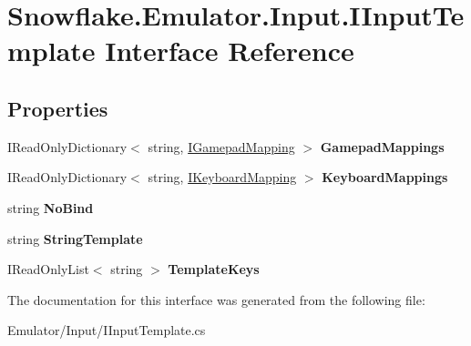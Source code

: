 \hypertarget{interface_snowflake_1_1_emulator_1_1_input_1_1_i_input_template}{}\section{Snowflake.\+Emulator.\+Input.\+I\+Input\+Template Interface Reference}
\label{interface_snowflake_1_1_emulator_1_1_input_1_1_i_input_template}
\subsection*{Properties}
\begin{DoxyCompactItemize}
\item 
\hypertarget{interface_snowflake_1_1_emulator_1_1_input_1_1_i_input_template_ab8e0a7d250f6734b895cc62ef7bbe710}{}I\+Read\+Only\+Dictionary$<$ string, \hyperlink{interface_snowflake_1_1_emulator_1_1_input_1_1_i_gamepad_mapping}{I\+Gamepad\+Mapping} $>$ {\bfseries Gamepad\+Mappings}\label{interface_snowflake_1_1_emulator_1_1_input_1_1_i_input_template_ab8e0a7d250f6734b895cc62ef7bbe710}

\item 
\hypertarget{interface_snowflake_1_1_emulator_1_1_input_1_1_i_input_template_a3e609bf0f4f4515ee91ea05f860f0211}{}I\+Read\+Only\+Dictionary$<$ string, \hyperlink{interface_snowflake_1_1_emulator_1_1_input_1_1_i_keyboard_mapping}{I\+Keyboard\+Mapping} $>$ {\bfseries Keyboard\+Mappings}\label{interface_snowflake_1_1_emulator_1_1_input_1_1_i_input_template_a3e609bf0f4f4515ee91ea05f860f0211}

\item 
\hypertarget{interface_snowflake_1_1_emulator_1_1_input_1_1_i_input_template_a7495a77567b2cc97ecf959ed0f9dc4de}{}string {\bfseries No\+Bind}\label{interface_snowflake_1_1_emulator_1_1_input_1_1_i_input_template_a7495a77567b2cc97ecf959ed0f9dc4de}

\item 
\hypertarget{interface_snowflake_1_1_emulator_1_1_input_1_1_i_input_template_a4771fa7fbc3f801990cf90a03185e010}{}string {\bfseries String\+Template}\label{interface_snowflake_1_1_emulator_1_1_input_1_1_i_input_template_a4771fa7fbc3f801990cf90a03185e010}

\item 
\hypertarget{interface_snowflake_1_1_emulator_1_1_input_1_1_i_input_template_ae96998d9a6dc349e5e12f99d455465d4}{}I\+Read\+Only\+List$<$ string $>$ {\bfseries Template\+Keys}\label{interface_snowflake_1_1_emulator_1_1_input_1_1_i_input_template_ae96998d9a6dc349e5e12f99d455465d4}

\end{DoxyCompactItemize}


The documentation for this interface was generated from the following file\+:\begin{DoxyCompactItemize}
\item 
Emulator/\+Input/I\+Input\+Template.\+cs\end{DoxyCompactItemize}
